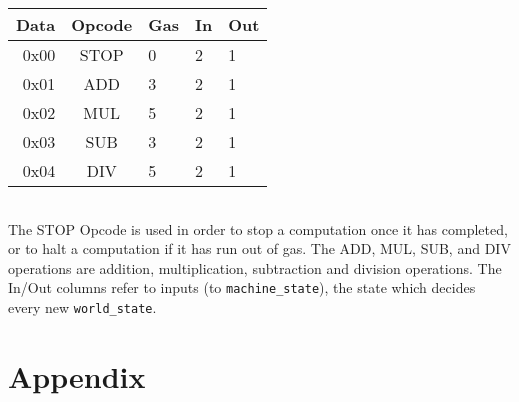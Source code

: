 \documentclass[10pt,a4paper,leqno,bibliography=totoc]{scrartcl}
\newenvironment{alphafootnotes}
{\par\edef\savedfootnotenumber{\number\value{footnote}}
\renewcommand{\thefootnote}{\alph{footnote}}
\setcounter{footnote}{0}}
{\par\setcounter{footnote}{\savedfootnotenumber}}
\begin{document}
\begin{alphafootnotes}
\begin{multicols*}{2}
\begin{tabular}{|rclll|}
	\hline
	\textbf{Data} & \textbf{Opcode} & \textbf{Gas} & \textbf{In} & \textbf{Out}  \\
	\hline
	0x00 & STOP & 0 & 2 & 1 \\
	0x01 & ADD & 3 & 2 & 1 \\
	0x02 & MUL & 5 & 2 & 1 \\
	0x03 & SUB & 3 & 2 & 1 \\
	0x04 & DIV & 5 & 2 & 1 \\ 
	\hline
\end{tabular}

				\paragraph{}The STOP Opcode is used in order to stop a computation once it has completed, or to halt a computation if it has run out of gas. The ADD, MUL, SUB, and DIV operations are addition, multiplication, subtraction and division operations. The In/Out columns refer to inputs (to \texttt{machine\_state}), the state which decides every new \texttt{world\_state}. 

\clearpage
\end{multicols*}
\part{Appendix}

\appendix


\end{alphafootnotes}
\end{document}
